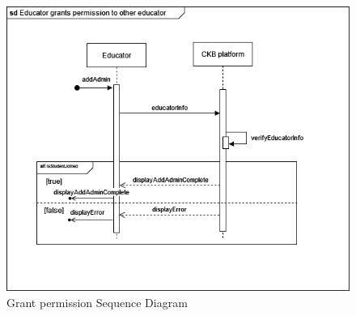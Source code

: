 \begin{center}
    \begin{figure} [H]
        \begin{center}
            \includegraphics[width=0.9\linewidth]{Images/SequenceDiagrams/SD_13.png}
            \caption{Grant permission Sequence Diagram}
            \label{fig: grant_permissions_seq_diag}
        \end{center}
    \end{figure}
\end{center}


        

